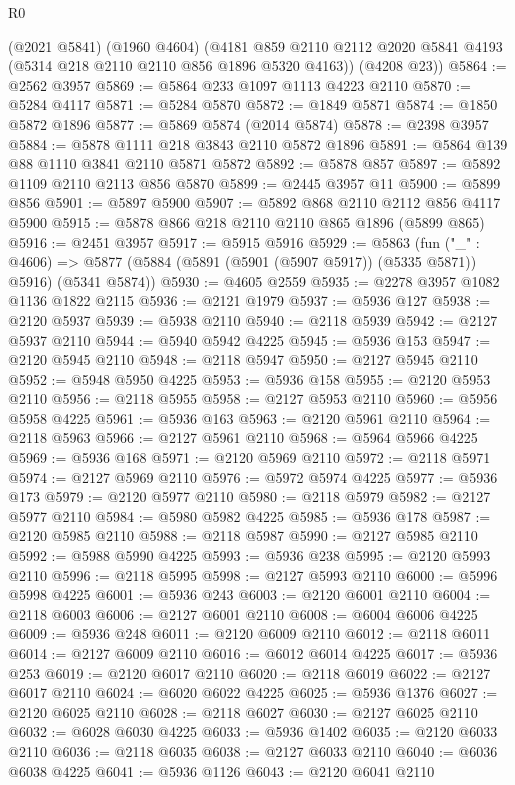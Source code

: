 \begin{lexlean}{R0}
\begin{coremodule}
      (@2021 @5841)
      (@1960 @4604)
      (@4181 @859 @2110 @2112 @2020 @5841 @4193 (@5314 @218 @2110 @2110 @856 @1896 @5320 @4163))
      (@4208 @23))
@5864 := @2562 @3957
@5869 := @5864 @233 @1097 @1113 @4223 @2110
@5870 := @5284 @4117
@5871 := @5284 @5870
@5872 := @1849 @5871
@5874 := @1850 @5872 @1896
@5877 := @5869 @5874 (@2014 @5874)
@5878 := @2398 @3957
@5884 := @5878 @1111 @218 @3843 @2110 @5872 @1896
@5891 := @5864 @139 @88 @1110 @3841 @2110 @5871 @5872
@5892 := @5878 @857
@5897 := @5892 @1109 @2110 @2113 @856 @5870
@5899 := @2445 @3957 @11
@5900 := @5899 @856
@5901 := @5897 @5900
@5907 := @5892 @868 @2110 @2112 @856 @4117 @5900
@5915 := @5878 @866 @218 @2110 @2110 @865 @1896 (@5899 @865)
@5916 := @2451 @3957
@5917 := @5915 @5916
@5929 := @5863
    (fun ("_" : @4606) =>
    @5877 (@5884 (@5891 (@5901 (@5907 @5917)) (@5335 @5871)) @5916) (@5341 @5874))
@5930 := @4605 @2559
@5935 := @2278 @3957 @1082 @1136 @1822 @2115
@5936 := @2121 @1979
@5937 := @5936 @127
@5938 := @2120 @5937
@5939 := @5938 @2110
@5940 := @2118 @5939
@5942 := @2127 @5937 @2110
@5944 := @5940 @5942 @4225
@5945 := @5936 @153
@5947 := @2120 @5945 @2110
@5948 := @2118 @5947
@5950 := @2127 @5945 @2110
@5952 := @5948 @5950 @4225
@5953 := @5936 @158
@5955 := @2120 @5953 @2110
@5956 := @2118 @5955
@5958 := @2127 @5953 @2110
@5960 := @5956 @5958 @4225
@5961 := @5936 @163
@5963 := @2120 @5961 @2110
@5964 := @2118 @5963
@5966 := @2127 @5961 @2110
@5968 := @5964 @5966 @4225
@5969 := @5936 @168
@5971 := @2120 @5969 @2110
@5972 := @2118 @5971
@5974 := @2127 @5969 @2110
@5976 := @5972 @5974 @4225
@5977 := @5936 @173
@5979 := @2120 @5977 @2110
@5980 := @2118 @5979
@5982 := @2127 @5977 @2110
@5984 := @5980 @5982 @4225
@5985 := @5936 @178
@5987 := @2120 @5985 @2110
@5988 := @2118 @5987
@5990 := @2127 @5985 @2110
@5992 := @5988 @5990 @4225
@5993 := @5936 @238
@5995 := @2120 @5993 @2110
@5996 := @2118 @5995
@5998 := @2127 @5993 @2110
@6000 := @5996 @5998 @4225
@6001 := @5936 @243
@6003 := @2120 @6001 @2110
@6004 := @2118 @6003
@6006 := @2127 @6001 @2110
@6008 := @6004 @6006 @4225
@6009 := @5936 @248
@6011 := @2120 @6009 @2110
@6012 := @2118 @6011
@6014 := @2127 @6009 @2110
@6016 := @6012 @6014 @4225
@6017 := @5936 @253
@6019 := @2120 @6017 @2110
@6020 := @2118 @6019
@6022 := @2127 @6017 @2110
@6024 := @6020 @6022 @4225
@6025 := @5936 @1376
@6027 := @2120 @6025 @2110
@6028 := @2118 @6027
@6030 := @2127 @6025 @2110
@6032 := @6028 @6030 @4225
@6033 := @5936 @1402
@6035 := @2120 @6033 @2110
@6036 := @2118 @6035
@6038 := @2127 @6033 @2110
@6040 := @6036 @6038 @4225
@6041 := @5936 @1126
@6043 := @2120 @6041 @2110

\end{coremodule}
\end{lexlean}
